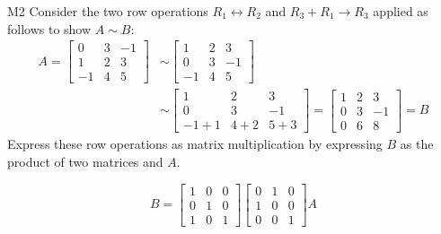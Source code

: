 \begin{problem}{M2}
Consider the two row operations 
\(R_1\leftrightarrow R_2\) and \(R_3+R_1\to R_3\)
applied as follows to show \(A\sim B\):
\begin{align*}
A
  =
\begin{bmatrix}
0&3&-1\\
1&2&3\\
-1&4&5
\end{bmatrix}
  &\sim
\begin{bmatrix}
1&2&3\\
0&3&-1\\
-1&4&5
\end{bmatrix}
  \\&\sim
\begin{bmatrix}
1&2&3\\
0&3&-1\\
-1+1&4+2&5+3
\end{bmatrix}
  =
\begin{bmatrix}
1&2&3\\
0&3&-1\\
0&6&8
\end{bmatrix}
  = 
B
\end{align*}
Express these row operations as matrix multiplication
by expressing \(B\) as the product of two matrices and \(A\).
\end{problem}
\begin{solution}
\[
B
  =
\begin{bmatrix}
  1&0&0\\
  0&1&0\\
  1&0&1
\end{bmatrix}
\begin{bmatrix}
  0&1&0\\
  1&0&0\\
  0&0&1
\end{bmatrix}
A
\]
\end{solution}


